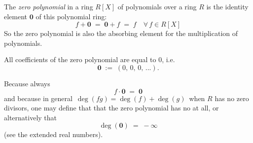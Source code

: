 \documentclass[12pt]{article}
\begin{document}
The {\em zero polynomial} in a ring $R[X]$ of polynomials over a ring $R$ is the  identity element $\textbf{0}$ of this polynomial ring:
$$f\!+\!\textbf{0} \;=\; \textbf{0}\!+\!f \;=\; f \quad\forall\, f\in R[X]$$
So the zero polynomial is also the absorbing element for the multiplication of polynomials.

All coefficients of the zero polynomial are equal to 0, i.e. 
$$\textbf{0} \;:=\; (0,\,0,\,0,\,...).$$

Because always
$$f\cdot\textbf{0} \;=\; \textbf{0}$$
and because in general \,$\deg(fg) = \deg(f)+\deg(g)$\, when $R$ has no zero divisors, one may define that that the zero polynomial has no  at all, or alternatively that
$$\deg(\textbf{0}) \;=\; -\infty$$
(see the extended real numbers).
\end{document}
